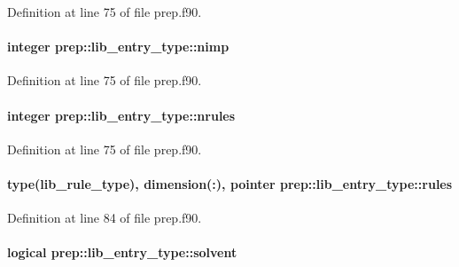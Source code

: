 Definition at line 75 of file prep.\-f90.

\hypertarget{structprep_1_1lib__entry__type_a465c1b3ff8f6a04457a92d6101a87ad2}{
\paragraph[{nimp}]{\setlength{\rightskip}{0pt plus 5cm}integer prep\-::lib\-\_\-entry\-\_\-type\-::nimp}}\label{structprep_1_1lib__entry__type_a465c1b3ff8f6a04457a92d6101a87ad2}


Definition at line 75 of file prep.\-f90.

\hypertarget{structprep_1_1lib__entry__type_a01c62928698a70dc1b6fc2dfb6f455fa}{
\paragraph[{nrules}]{\setlength{\rightskip}{0pt plus 5cm}integer prep\-::lib\-\_\-entry\-\_\-type\-::nrules}}\label{structprep_1_1lib__entry__type_a01c62928698a70dc1b6fc2dfb6f455fa}


Definition at line 75 of file prep.\-f90.

\hypertarget{structprep_1_1lib__entry__type_ad626ae881825fdd49045c7f178c0cc49}{
\paragraph[{rules}]{\setlength{\rightskip}{0pt plus 5cm}type({\bf lib\-\_\-rule\-\_\-type}), dimension(\-:), pointer prep\-::lib\-\_\-entry\-\_\-type\-::rules}}\label{structprep_1_1lib__entry__type_ad626ae881825fdd49045c7f178c0cc49}


Definition at line 84 of file prep.\-f90.

\hypertarget{structprep_1_1lib__entry__type_aa396848da6da0139017933ce6903c403}{
\paragraph[{solvent}]{\setlength{\rightskip}{0pt plus 5cm}logical prep\-::lib\-\_\-entry\-\_\-type\-::solvent}}\label{structprep_1_1lib__entry__type_aa396848da6da0139017933ce6903c403}


